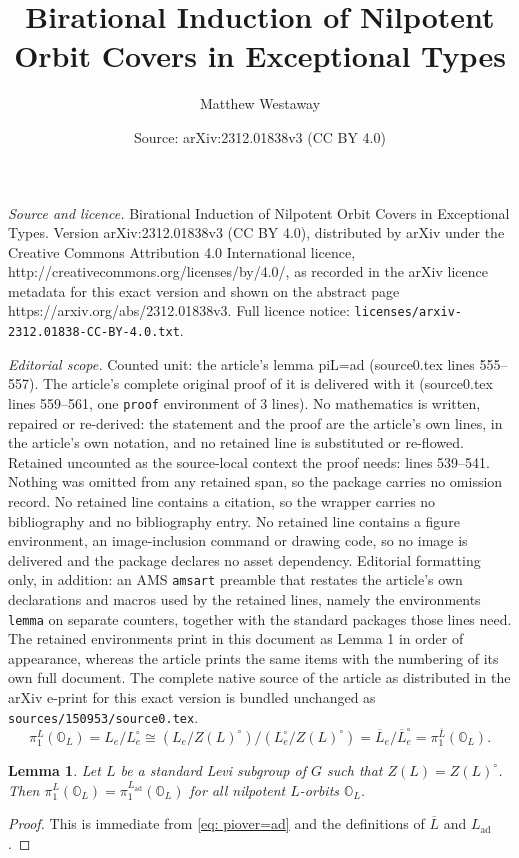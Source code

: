 \documentclass[10pt,a4paper]{amsart}
\title{Birational Induction of Nilpotent Orbit Covers in Exceptional Types}
\author{Matthew Westaway}
\date{Source: arXiv:2312.01838v3 (CC BY 4.0)}
\newtheorem{lemma}{Lemma}
\renewcommand{\O}{{\mathbb O}}
\newcommand{\ad}{{\operatorname{ad}}}
\begin{document}
\maketitle

\noindent\emph{Source and licence.} Birational Induction of Nilpotent Orbit Covers in Exceptional Types. Version arXiv:2312.01838v3 (CC BY 4.0), distributed by arXiv under the Creative Commons Attribution 4.0 International licence, http://creativecommons.org/licenses/by/4.0/, as recorded in the arXiv licence metadata for this exact version and shown on the abstract page https://arxiv.org/abs/2312.01838v3. Full licence notice: \texttt{licenses/arxiv-2312.01838-CC-BY-4.0.txt}.\par\smallskip

\noindent\textit{Editorial scope.} Counted unit: the article's lemma piL=ad (source0.tex lines 555--557). The article's complete original proof of it is delivered with it (source0.tex lines 559--561, one \texttt{proof} environment of 3 lines). No mathematics is written, repaired or re-derived: the statement and the proof are the article's own lines, in the article's own notation, and no retained line is substituted or re-flowed.  Retained uncounted as the source-local context the proof needs: lines 539--541.  Nothing was omitted from any retained span, so the package carries no omission record.  No retained line contains a citation, so the wrapper carries no bibliography and no bibliography entry.  No retained line contains a figure environment, an image-inclusion command or drawing code, so no image is delivered and the package declares no asset dependency.  Editorial formatting only, in addition: an AMS \texttt{amsart} preamble that restates the article's own declarations and macros used by the retained lines, namely the environments \texttt{lemma} on separate counters, together with the standard packages those lines need.  The retained environments print in this document as Lemma 1 in order of appearance, whereas the article prints the same items with the numbering of its own full document.  The complete native source of the article as distributed in the arXiv e-print for this exact version is bundled unchanged as \texttt{sources/150953/source0.tex}.
	\begin{equation}\label{eq: piover=ad}
		\pi_1^L(\O_L)=L_e/L_e^\circ \cong (L_e/Z(L)^\circ)/(L_e^\circ/Z(L)^\circ)=\overline{L}_e/\overline{L}_e^\circ=\pi_1^{\overline{L}}(\O_L).
	\end{equation}

	\begin{lemma}\label{cor: piL=ad}
		Let $L$ be a standard Levi subgroup of $G$ such that $Z(L)=Z(L)^\circ$. Then $\pi_1^L(\O_L)=\pi_1^{L_\ad}(\O_L)$ for all nilpotent $L$-orbits $\O_L$.
	\end{lemma}

	\begin{proof}
		This is immediate from \eqref{eq: piover=ad} and the definitions of $\overline{L}$ and $L_\ad$.
	\end{proof}
\end{document}
